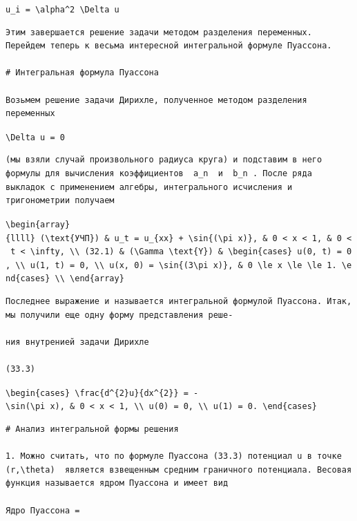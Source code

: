 \documentclass[
  ukrainian,
]{article}
\begin{document}
\texttt{u\_i\ =\ \textbackslash{}alpha\^{}2\ \textbackslash{}Delta\ u}

\begin{verbatim}
Этим завершается решение задачи методом разделения переменных. Перейдем теперь к весьма интересной интегральной формуле Пуассона.

# Интегральная формула Пуассона

Возьмем решение задачи Дирихле, полученное методом разделения переменных
\end{verbatim}

\texttt{\textbackslash{}Delta\ u\ =\ 0}

\begin{verbatim}
(мы взяли случай произвольного радиуса круга) и подставим в него формулы для вычисления коэффициентов  a_n  и  b_n . После ряда выкладок с применением алгебры, интегрального исчисления и тригонометрии получаем
\end{verbatim}

\texttt{\textbackslash{}begin\{array\}\{llll\}\ (\textbackslash{}text\{УЧП\})\ \&\ u\_t\ =\ u\_\{xx\}\ +\ \textbackslash{}sin\{(\textbackslash{}pi\ x)\},\ \&\ 0\ \textless{}\ x\ \textless{}\ 1,\ \&\ 0\ \textless{}\ t\ \textless{}\ \textbackslash{}infty,\ \textbackslash{}\textbackslash{}\ (32.1)\ \&\ (\textbackslash{}Gamma\ \textbackslash{}text\{Y\})\ \&\ \textbackslash{}begin\{cases\}\ u(0,\ t)\ =\ 0,\ \textbackslash{}\textbackslash{}\ u(1,\ t)\ =\ 0,\ \textbackslash{}\textbackslash{}\ u(x,\ 0)\ =\ \textbackslash{}sin\{(3\textbackslash{}pi\ x)\},\ \&\ 0\ \textbackslash{}le\ x\ \textbackslash{}le\ \textbackslash{}le\ 1.\ \textbackslash{}end\{cases\}\ \textbackslash{}\textbackslash{}\ \textbackslash{}end\{array\}}

\begin{verbatim}
Последнее выражение и называется интегральной формулой Пуассона. Итак, мы получили еще одну форму представления реше-

ния внутренией задачи Дирихле

(33.3)
\end{verbatim}

\texttt{\textbackslash{}begin\{cases\}\ \textbackslash{}frac\{d\^{}\{2\}u\}\{dx\^{}\{2\}\}\ =\ -\textbackslash{}sin(\textbackslash{}pi\ x),\ \&\ 0\ \textless{}\ x\ \textless{}\ 1,\ \textbackslash{}\textbackslash{}\ u(0)\ =\ 0,\ \textbackslash{}\textbackslash{}\ u(1)\ =\ 0.\ \textbackslash{}end\{cases\}}

\begin{verbatim}
# Анализ интегральной формы решения

1. Можно считать, что по формуле Пуассона (33.3) потенциал u в точке  (r,\theta)  является взвещенным средним граничного потенциала. Весовая функция называется ядром Пуассона и имеет вид

Ядро Пуассона =
\end{verbatim}
\end{document}
